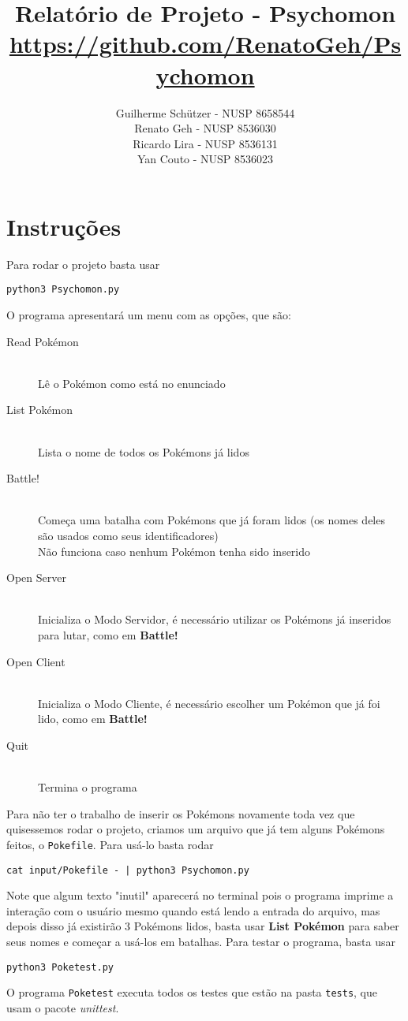 \documentclass[a4paper]{article}
\title{Relatório de Projeto - Psychomon \\\small{\url{https://github.com/RenatoGeh/Psychomon}}}
\author{
Guilherme Schützer - NUSP 8658544 \\
Renato Geh         - NUSP 8536030 \\
Ricardo Lira       - NUSP 8536131 \\
Yan Couto          - NUSP 8536023
}
\date{}
\begin{document}
\maketitle

\section*{Instruções}
Para rodar o projeto basta usar
\begin{center}
\texttt{python3 Psychomon.py}
\end{center}
O programa apresentará um menu com as opções, que são:
\begin{description}
\item[Read Pokémon] \hfill \\ Lê o Pokémon como está no enunciado
\item[List Pokémon] \hfill \\ Lista o nome de todos os Pokémons já lidos
\item[Battle!] \hfill \\ Começa uma batalha com Pokémons que já foram lidos
(os nomes deles são usados como seus identificadores) \\ Não funciona caso
nenhum Pokémon tenha sido inserido
\item[Open Server] \hfill \\ Inicializa o Modo Servidor, é necessário utilizar
os Pokémons já inseridos para lutar, como em \textbf{Battle!}
\item[Open Client] \hfill \\ Inicializa o Modo Cliente, é necessário escolher um
Pokémon que já foi lido, como em \textbf{Battle!}
\item[Quit] \hfill \\ Termina o programa
\end{description}
Para não ter o trabalho de inserir os Pokémons novamente toda vez que quisessemos
rodar o projeto, criamos um arquivo que já tem alguns Pokémons feitos, o \texttt{Pokefile}.
Para usá-lo basta rodar
\begin{center}
\texttt{cat input/Pokefile - | python3 Psychomon.py}
\end{center}
Note que algum texto "inutil" aparecerá no terminal pois o programa imprime a
interação com o usuário mesmo quando está lendo a entrada do arquivo, mas depois
disso já existirão 3 Pokémons lidos, basta usar \textbf{List Pokémon} para saber
seus nomes e começar a usá-los em batalhas.
\newpage
Para testar o programa, basta usar
\begin{center}
\texttt{python3 Poketest.py}
\end{center}
O programa \texttt{Poketest} executa todos os testes que estão na pasta \texttt{tests},
que usam o pacote \emph{unittest}.
\end{document}
